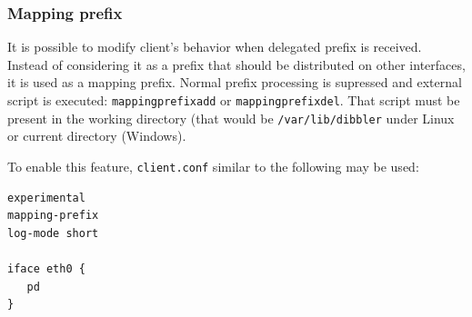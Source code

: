 \subsubsection{Mapping prefix}
It is possible to modify client's behavior when delegated prefix is
received. Instead of considering it as a prefix that should be
distributed on other interfaces, it is used as a mapping
prefix. Normal prefix processing is supressed and external script is
executed: \verb+mappingprefixadd+ or \verb+mappingprefixdel+. That
script must be present in the working directory (that would be
\verb+/var/lib/dibbler+ under Linux or current directory (Windows).

To enable this feature, \verb+client.conf+ similar to the following
may be used:

\begin{lstlisting}
experimental
mapping-prefix
log-mode short

iface eth0 {
   pd
}
\end{lstlisting}
